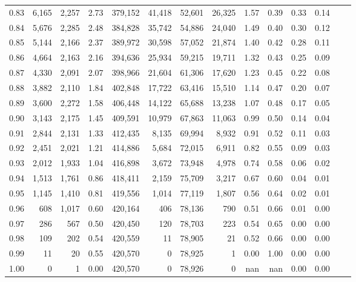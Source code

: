 \begin{tabular}{rrrrrrrrrrrrrr}
0.83 &  6,165 &  2,257 &    2.73 &  379,152 &   41,418 &  52,601 &  26,325 &  1.57 &  0.39 &  0.33 &      0.14 \\
0.84 &  5,676 &  2,285 &    2.48 &  384,828 &   35,742 &  54,886 &  24,040 &  1.49 &  0.40 &  0.30 &      0.12 \\
0.85 &  5,144 &  2,166 &    2.37 &  389,972 &   30,598 &  57,052 &  21,874 &  1.40 &  0.42 &  0.28 &      0.11 \\
0.86 &  4,664 &  2,163 &    2.16 &  394,636 &   25,934 &  59,215 &  19,711 &  1.32 &  0.43 &  0.25 &      0.09 \\
0.87 &  4,330 &  2,091 &    2.07 &  398,966 &   21,604 &  61,306 &  17,620 &  1.23 &  0.45 &  0.22 &      0.08 \\
0.88 &  3,882 &  2,110 &    1.84 &  402,848 &   17,722 &  63,416 &  15,510 &  1.14 &  0.47 &  0.20 &      0.07 \\
0.89 &  3,600 &  2,272 &    1.58 &  406,448 &   14,122 &  65,688 &  13,238 &  1.07 &  0.48 &  0.17 &      0.05 \\
0.90 &  3,143 &  2,175 &    1.45 &  409,591 &   10,979 &  67,863 &  11,063 &  0.99 &  0.50 &  0.14 &      0.04 \\
0.91 &  2,844 &  2,131 &    1.33 &  412,435 &    8,135 &  69,994 &   8,932 &  0.91 &  0.52 &  0.11 &      0.03 \\
0.92 &  2,451 &  2,021 &    1.21 &  414,886 &    5,684 &  72,015 &   6,911 &  0.82 &  0.55 &  0.09 &      0.03 \\
0.93 &  2,012 &  1,933 &    1.04 &  416,898 &    3,672 &  73,948 &   4,978 &  0.74 &  0.58 &  0.06 &      0.02 \\
0.94 &  1,513 &  1,761 &    0.86 &  418,411 &    2,159 &  75,709 &   3,217 &  0.67 &  0.60 &  0.04 &      0.01 \\
0.95 &  1,145 &  1,410 &    0.81 &  419,556 &    1,014 &  77,119 &   1,807 &  0.56 &  0.64 &  0.02 &      0.01 \\
0.96 &    608 &  1,017 &    0.60 &  420,164 &      406 &  78,136 &     790 &  0.51 &  0.66 &  0.01 &      0.00 \\
0.97 &    286 &    567 &    0.50 &  420,450 &      120 &  78,703 &     223 &  0.54 &  0.65 &  0.00 &      0.00 \\
0.98 &    109 &    202 &    0.54 &  420,559 &       11 &  78,905 &      21 &  0.52 &  0.66 &  0.00 &      0.00 \\
0.99 &     11 &     20 &    0.55 &  420,570 &        0 &  78,925 &       1 &  0.00 &  1.00 &  0.00 &      0.00 \\
1.00 &      0 &      1 &    0.00 &  420,570 &        0 &  78,926 &       0 &   nan &   nan &  0.00 &      0.00 \\
\bottomrule
\end{tabular}
